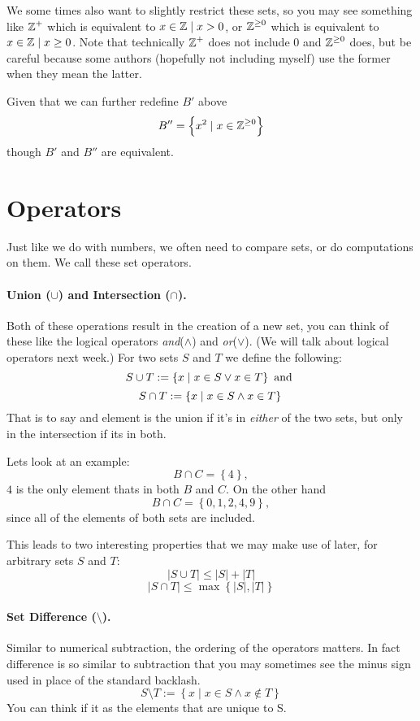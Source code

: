 We some times also want to slightly restrict these sets, so you may see something like $\operatorname{\mathbb{Z}}^+$ which is equivalent to ${x \in \operatorname{\mathbb{Z}} \mid x > 0}$, 
or $\operatorname{\mathbb{Z}}^{\ge0}$ which is equivalent to ${x \in \operatorname{\mathbb{Z}} \mid x \ge 0}$.
Note that technically $\operatorname{\mathbb{Z}}^+$ does not include 0 and $\operatorname{\mathbb{Z}}^{\ge0}$ does, 
but be careful because some authors (hopefully not including myself) use the former when they mean the latter. 

Given that we can further redefine $B'$ above 
\[
B'' = \left\{x^2 \mid x \in \operatorname{\mathbb{Z}}^{\ge0} \right\}
\]
 though $B'$ and $B''$ are equivalent. 
 
\section{Operators}

Just like we do with numbers, we often need to compare sets, or do computations on them.
We call these set operators. 

\paragraph{Union ($\cup$) and Intersection ($\cap$).}
Both of these operations result in the creation of a new set, 
you can think of these like the logical operators \textit{and}($\wedge$) and \textit{or}($\vee$). (We will talk about logical operators next week.)
For two sets $S$ and $T$ we define the following: 
\[
S\cup T := \left\{x \mid x \in S \vee x \in T\right\} \textnormal{ and }
\]\[
S\cap T := \left\{x \mid x \in S \wedge x \in T\right\} \\
\]
That is to say and element is the union if it's in \textit{either} of the two sets, but only in the intersection if its in both. 

Lets look at an example:
\[
B \cap C = \left\{4\right\},
\]
$4$ is the only element thats in both $B$ and $C$. 
On the other hand 
\[
B \cap C = \left\{0,1,2,4,9\right\},
\]
since all of the elements of both sets are included. 

This leads to two interesting properties that we may make use of later, for arbitrary sets $S$ and $T$: 
\[
|S\cup T| \le  |S| + |T|
\]
\[
|S\cap T| \le \max\left\{|S|, |T|\right\}
\]

\paragraph{Set Difference ($\setminus$).}
Similar to numerical subtraction, the ordering of the operators matters. 
In fact difference is so similar to subtraction that you may sometimes see the minus sign used in place of the standard backlash. 
\[
S\setminus T  := \left\{x \mid x \in S \wedge x \notin T\right\} 
\]
You can think if it as the elements that are unique to S. 


